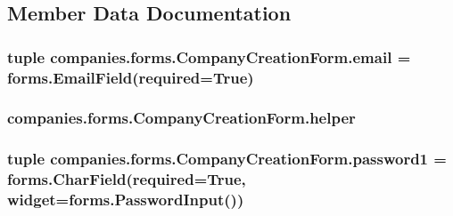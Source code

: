 \subsection{Member Data Documentation}
\hypertarget{classcompanies_1_1forms_1_1_company_creation_form_aec3e6751f4d160012a20ff0c0f80ff4d}{
\subsubsection[{email}]{\setlength{\rightskip}{0pt plus 5cm}tuple companies.\-forms.\-Company\-Creation\-Form.\-email = forms.\-Email\-Field(required=True)\hspace{0.3cm}{\ttfamily [static]}}}\label{classcompanies_1_1forms_1_1_company_creation_form_aec3e6751f4d160012a20ff0c0f80ff4d}
\hypertarget{classcompanies_1_1forms_1_1_company_creation_form_a2b16f5d30b5392224ef78ae75b1561bb}{
\subsubsection[{helper}]{\setlength{\rightskip}{0pt plus 5cm}companies.\-forms.\-Company\-Creation\-Form.\-helper}}\label{classcompanies_1_1forms_1_1_company_creation_form_a2b16f5d30b5392224ef78ae75b1561bb}
\hypertarget{classcompanies_1_1forms_1_1_company_creation_form_aa84a1df9aba4381d071afc4a880455be}{
\subsubsection[{password1}]{\setlength{\rightskip}{0pt plus 5cm}tuple companies.\-forms.\-Company\-Creation\-Form.\-password1 = forms.\-Char\-Field(required=True, {\bf widget}=forms.\-Password\-Input())\hspace{0.3cm}{\ttfamily [static]}}}\label{classcompanies_1_1forms_1_1_company_creation_form_aa84a1df9aba4381d071afc4a880455be}
